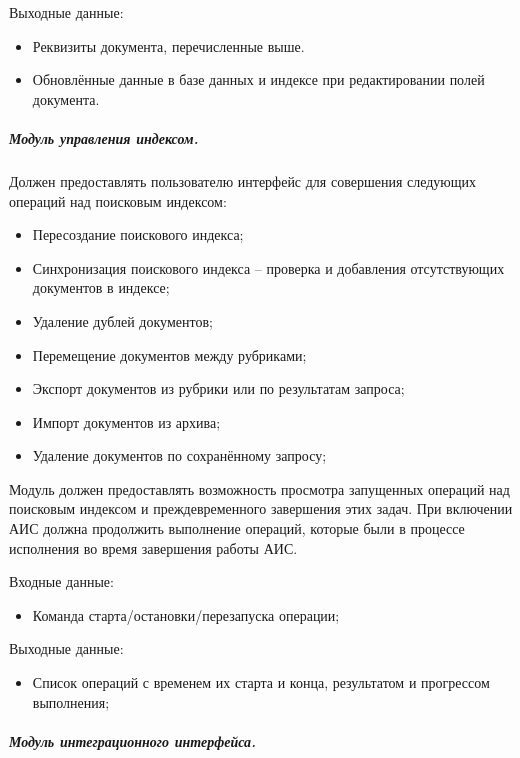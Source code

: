 Выходные данные:
\begin{itemize}
\item Реквизиты документа, перечисленные выше.
\item Обновлённые данные в базе данных и индексе при редактировании полей документа.
\end{itemize}

\subparagraph{Модуль управления индексом.} \hfill

Должен предоставлять пользователю интерфейс для совершения следующих
операций над поисковым индексом:
\begin{itemize}
\item Пересоздание поискового индекса;
\item Синхронизация поискового индекса -- проверка и добавления отсутствующих документов в индексе;
\item Удаление дублей документов;
\item Перемещение документов между рубриками; 
\item Экспорт документов из рубрики или по результатам запроса;
\item Импорт документов из архива;
\item Удаление документов по сохранённому запросу;
\end{itemize}

Модуль должен предоставлять возможность просмотра запущенных операций над поисковым индексом и преждевременного завершения этих задач. При включении АИС должна продолжить выполнение операций, которые были в процессе исполнения во время завершения работы АИС.

Входные данные:
\begin{itemize}
\item Команда старта/остановки/перезапуска операции;
\end{itemize}

Выходные данные:
\begin{itemize}
\item Список операций с временем их старта и конца, результатом и прогрессом выполнения;
\end{itemize}

\subparagraph{Модуль интеграционного интерфейса.} \hfill

